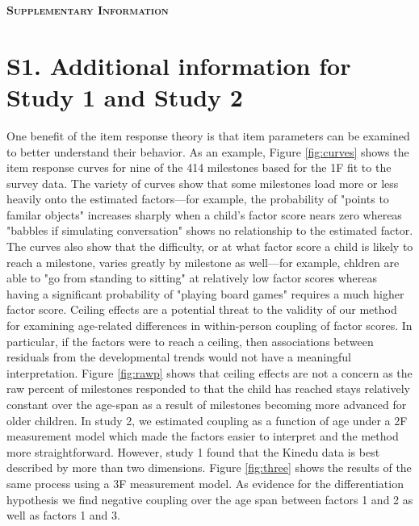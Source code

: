 \documentclass[man]{apa7}
\begin{document}


\begin{center}
\textbf{\textsc{\LARGE Supplementary Information}}\\
\end{center}

\section{S1. Additional information for Study 1 and Study 2}

One benefit of the item response theory is that item parameters can be examined to better understand their behavior. As an example, Figure \ref{fig:curves} shows the item response curves for nine of the 414 milestones based for the 1F fit to the survey data. The variety of curves show that some milestones load more or less heavily onto the estimated factors—for example, the probability of "points to familar objects" increases sharply when a child's factor score nears zero whereas "babbles if simulating conversation" shows no relationship to the estimated factor. The curves also show that the difficulty, or at what factor score a child is likely to reach a milestone, varies greatly by milestone as well—for example, chldren are able to "go from standing to sitting" at relatively low factor scores whereas having a significant probability of "playing board games" requires a much higher factor score.
Ceiling effects are a potential threat to the validity of our method for examining age-related differences in within-person coupling of factor scores. In particular, if the factors were to reach a ceiling, then associations between residuals from the developmental trends would not have a meaningful interpretation. Figure \ref{fig:rawp} shows that ceiling effects are not a concern as the raw percent of milestones responded to that the child has reached stays relatively constant over the age-span as a result of milestones becoming more advanced for older children.
In study 2, we estimated coupling as a function of age under a 2F measurement model which made the factors easier to interpret and the method more straightforward. However, study 1 found that the Kinedu data is best described by more than two dimensions. Figure \ref{fig:three} shows the results of the same process using a 3F measurement model. As evidence for the differentiation hypothesis we find negative coupling over the age span between factors 1 and 2 as well as factors 1 and 3.
\end{document}
